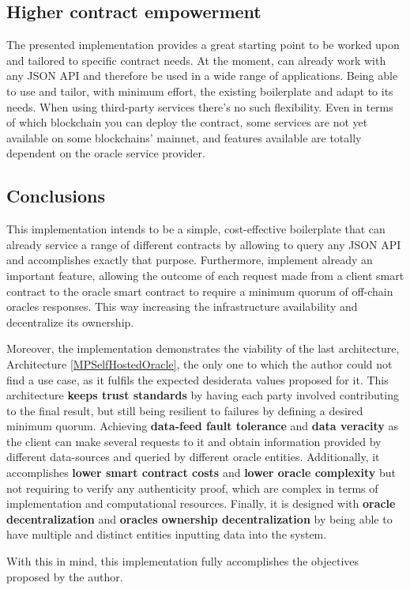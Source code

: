 \subsection{Higher contract empowerment}

The presented implementation provides a great starting point to be worked upon and tailored to specific contract needs. At the moment, can already work with any JSON API and therefore be used in a wide range of applications. Being able to use and tailor, with minimum effort, the existing boilerplate and adapt to its needs. When using third-party services there's no such flexibility. Even in terms of which blockchain you can deploy the contract, some services are not yet available on some blockchains' mainnet, and features available are totally dependent on the oracle service provider.

\subsection{Conclusions}

This implementation intends to be a simple, cost-effective boilerplate that can already service a range of different contracts by allowing to query any JSON API and accomplishes exactly that purpose. Furthermore, implement already an important feature, allowing the outcome of each request made from a client smart contract to the oracle smart contract to require a minimum quorum of off-chain oracles responses. This way increasing the infrastructure availability and decentralize its ownership.

Moreover, the implementation demonstrates the viability of the last architecture, Architecture \ref{MPSelfHostedOracle}, the only one to which the author could not find a use case, as it fulfils the expected desiderata values proposed for it. This architecture \textbf{keeps trust standards} by having each party involved contributing to the final result, but still being resilient to failures by defining a desired minimum quorum. Achieving \textbf{data-feed fault tolerance} and \textbf{data veracity} as the client can make several requests to it and obtain information provided by different data-sources and queried by different oracle entities. Additionally, it accomplishes \textbf{lower smart contract costs} and \textbf{lower oracle complexity} but not requiring to verify any authenticity proof, which are complex in terms of implementation and computational resources. Finally, it is designed with \textbf{oracle decentralization} and \textbf{oracles ownership decentralization} by being able to have multiple and distinct entities inputting data into the system.

With this in mind, this implementation fully accomplishes the objectives proposed by the author.